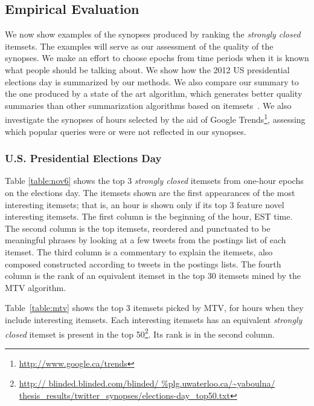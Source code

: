 \documentclass{sig-alternate}
\begin{document}
\subsection{Empirical Evaluation}
\label{sec:empirical}
We now show examples of the synopses produced by ranking
the \emph{strongly closed} itemsets. %
The examples will serve as our assessment of the quality of 
the synopses. 
We make an effort to choose epochs from time periods when 
it is known what people should be talking about. 
We show how the 2012 US presidential elections day is summarized by our methods. %
We also compare our summary to the one produced by a state of the art algorithm,
which generates better quality summaries than other summarization algorithms based on itemsets~\cite{mampaey2011tell}. 
We also investigate the synopses of hours selected by the aid of Google Trends\footnote{\url{http://www.google.ca/trends}},
assessing which popular queries were or were not reflected in our synopses.

\subsubsection{U.S. Presidential Elections Day}
Table \ref{table:nov6} shows the top 3 \emph{strongly closed} itemsets
from one-hour epochs on the elections day.
The itemsets shown are the first appearances of the most interesting itemsets;
that is, an hour is shown only if its top 3 feature novel interesting itemsets.
The first column is the beginning of the hour, EST time.
The second column is the top itemsets, 
reordered and punctuated to be meaningful phrases 
by looking at a few tweets from the postings list of each itemset.
The third column is a commentary to explain the itemsets,
also composed constructed according to tweets in the postings lists.
The fourth column is the rank of an equivalent itemset 
in the top 30 itemsets mined by the MTV algorithm. %

Table~\ref{table:mtv} shows the top 3 itemsets picked by MTV, 
for hours when they include interesting itemsets.
Each interesting itemsets has
an equivalent \emph{strongly closed} itemset is 
present in the top 50\footnote{\url{http://
blinded.blinded.com/blinded/
thesis_results/twitter_synopses/elections-day_top50.txt}}.
Its rank is in the second column.
\end{document}
